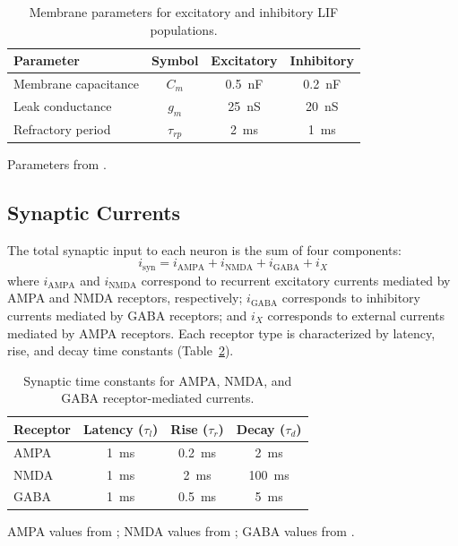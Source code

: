 \documentclass[10pt]{article}
\begin{document}
\begin{table}[htbp]
\centering
\caption{Membrane parameters for excitatory and inhibitory LIF populations.}
\label{tab:neuron_params}
\begin{tabular}{lccc}
\toprule
Parameter & Symbol & Excitatory & Inhibitory \\
\midrule
Membrane capacitance & $C_m$ & 0.5~nF & 0.2~nF \\
Leak conductance & $g_m$ & 25~nS & 20~nS \\
Refractory period & $\tau_{rp}$ & 2~ms & 1~ms \\
\bottomrule
\end{tabular}
\begin{flushleft}
\footnotesize{Parameters from \citet{koch2004biophysics}.}
\end{flushleft}
\end{table}

\subsection{Synaptic Currents}

The total synaptic input to each neuron is the sum of four components:
\begin{equation}
i_{\text{syn}} = i_{\text{AMPA}} + i_{\text{NMDA}} + i_{\text{GABA}} + i_X
\end{equation}
where $i_{\text{AMPA}}$ and $i_{\text{NMDA}}$ correspond to recurrent
excitatory currents mediated by AMPA and NMDA receptors, respectively;
$i_{\text{GABA}}$ corresponds to inhibitory currents mediated by GABA
receptors; and $i_X$ corresponds to external currents mediated by AMPA
receptors. Each receptor type is characterized by latency, rise, and decay
time constants (Table~\ref{tab:synaptic_params}).

\begin{table}[htbp]
\centering
\caption{Synaptic time constants for AMPA, NMDA, and GABA receptor-mediated currents.}
\label{tab:synaptic_params}
\begin{tabular}{lccc}
\toprule
Receptor & Latency ($\tau_l$) & Rise ($\tau_r$) & Decay ($\tau_d$) \\
\midrule
AMPA & 1~ms & 0.2~ms & 2~ms \\
NMDA & 1~ms & 2~ms & 100~ms \\
GABA & 1~ms & 0.5~ms & 5~ms \\
\bottomrule
\end{tabular}
\begin{flushleft}
\footnotesize{AMPA values from \citet{zhou1998ampa}; NMDA values from
\citet{hestrin1990analysis}; GABA values from \citet{gupta2000organizing}.}
\end{flushleft}
\end{table}
\end{document}
